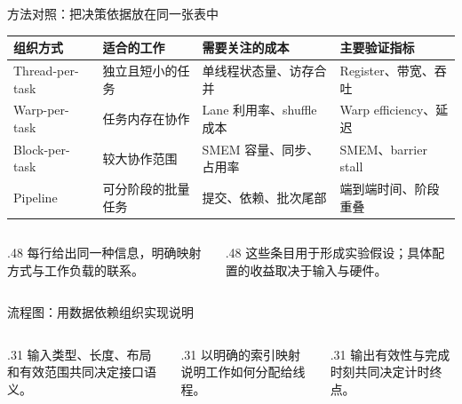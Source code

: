 \begin{frame}{方法对照：把决策依据放在同一张表中}
\begin{tabularx}{\textwidth}{@{}>{\raggedright\arraybackslash}p{2.65cm}>{\raggedright\arraybackslash}X>{\raggedright\arraybackslash}X>{\raggedright\arraybackslash}X@{}}
\toprule 组织方式 & 适合的工作 & 需要关注的成本 & 主要验证指标 \\\midrule
Thread-per-task & 独立且短小的任务 & 单线程状态量、访存合并 & Register、带宽、吞吐 \\
Warp-per-task & 任务内存在协作 & Lane 利用率、shuffle 成本 & Warp efficiency、延迟 \\
Block-per-task & 较大协作范围 & SMEM 容量、同步、占用率 & SMEM、barrier stall \\
Pipeline & 可分阶段的批量任务 & 提交、依赖、批次尾部 & 端到端时间、阶段重叠 \\\bottomrule
\end{tabularx}
\par\vspace{0.8mm}
\begin{columns}[T,onlytextwidth]
\begin{column}{.48\textwidth}
每行给出同一种信息，明确映射方式与工作负载的联系。
\end{column}
\begin{column}{.48\textwidth}
这些条目用于形成实验假设；具体配置的收益取决于输入与硬件。
\end{column}
\end{columns}
\end{frame}

\begin{frame}{流程图：用数据依赖组织实现说明}
\vspace{3mm}
\begin{columns}[T,onlytextwidth]
\begin{column}{.31\textwidth}
输入类型、长度、布局和有效范围共同决定接口语义。
\end{column}
\begin{column}{.31\textwidth}
以明确的索引映射说明工作如何分配给线程。
\end{column}
\begin{column}{.31\textwidth}
输出有效性与完成时刻共同决定计时终点。
\end{column}
\end{columns}
\end{frame}
